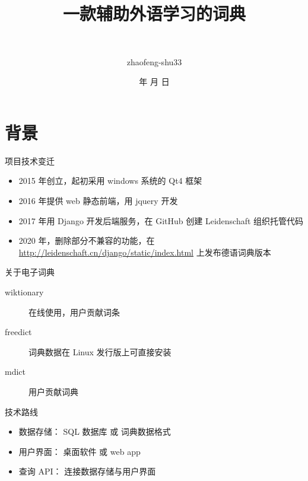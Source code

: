 \documentclass[notheorems,xetex]{beamer}
\title{一款辅助外语学习的词典} %
\author[赵丰]
{\quad {赵丰}\\ \and {zhaofeng-shu33}}
\institute[清华大学] %
{\normalsize\quad
  2020中文学生开源年会
}
\date{\the\year 年 \the\month 月 \the\day 日}
\begin{document}
\frame{\titlepage}
\frame{\tableofcontents}
\section{背景}
\begin{frame}{项目技术变迁}
\begin{itemize}
	\item 2015 年创立，起初采用 windows 系统的 Qt4 框架
	\item 2016 年提供 web 静态前端，用 jquery 开发
	\item 2017 年用 Django 开发后端服务，在 GitHub 创建 Leidenschaft 组织托管代码
	\item 2020 年，删除部分不兼容的功能，在 \url{http://leidenschaft.cn/django/static/index.html} 上发布德语词典版本
\end{itemize}
\end{frame}
\begin{frame}{关于电子词典}
\begin{description}
	\item[wiktionary] 在线使用，用户贡献词条
	\item[freedict]	词典数据在 Linux 发行版上可直接安装
	\item[mdict] 用户贡献词典
\end{description}
\begin{block}{技术路线}
\begin{itemize}
	\item 数据存储： SQL 数据库 或 词典数据格式
	\item 用户界面： 桌面软件 或 web app
	\item 查询 API： 连接数据存储与用户界面
\end{itemize}
\end{block}
\end{frame}
\end{document}
